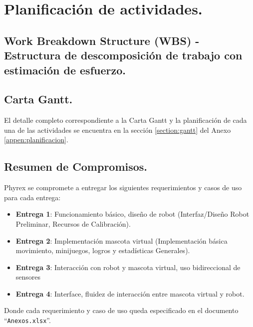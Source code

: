 \chapter{Planificaci\'on de actividades.}
\newpage
\section[Work Breakdown Structure (WBS)]{Work Breakdown Structure (WBS) - Estructura de descomposici\'on de trabajo con estimaci\'on de esfuerzo.}
\section{Carta Gantt.}
El detalle completo correspondiente a la Carta Gantt y la planificaci\'on de cada una de las actividades se encuentra en la secci\'on \ref{section:gantt} del Anexo \ref{appen:planificacion}.

\section{Resumen de Compromisos.}
Phyrex se compromete a entregar los siguientes requerimientos y casos de uso para cada entrega:

\begin{itemize}
\item {\bf Entrega 1}: Funcionamiento b\'asico, dise\~no de robot (Interfaz/Dise\~no Robot Preliminar, Recursos de Calibraci\'on).
\item {\bf Entrega 2}: Implementaci\'on mascota virtual (Implementaci\'on b\'asica movimiento, minijuegos, logros y estad\'isticas Generales).
\item {\bf Entrega 3}: Interacci\'on con robot y mascota virtual, uso bidireccional de sensores
\item {\bf Entrega 4}: Interface, fluidez de interacci\'on entre mascota virtual y robot.
\end{itemize}

Donde cada requerimiento y caso de uso queda especificado en el documento ``\verb+Anexos.xlsx+''.
\newpage
